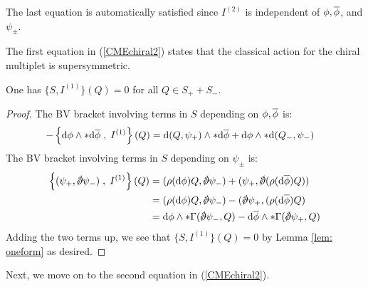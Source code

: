 \documentclass[10pt, oneside]{article}
\begin{document}
The last equation is automatically satisfied since $I^{(2)}$ is independent of $\phi, \Bar{\phi}$, and $\psi_{\pm}$. 

The first equation in (\ref{CMEchiral2}) states that the classical action for the chiral multiplet is supersymmetric. 

\begin{lemma} 
One has $\{S, I^{(1)}\} (Q) = 0$ for all $Q \in S_+ + S_-$. 
\end{lemma}
\begin{proof}
The BV bracket involving terms in $S$ depending on $\phi,\Bar{\phi}$ is:
\begin{align*}
- \left\{\d \phi \wedge * \d \Bar{\phi} \; , \; I^{(1)} \right\}  (Q) & = \d (Q, \psi_+) \wedge * \d \Bar{\phi} + \d \phi \wedge * \d (Q_-, \psi_-) 
\end{align*}
The BV bracket involving terms in $S$ depending on $\psi_\pm$ is:
\begin{align*}
\left\{ (\psi_+ , \sd \dd \psi_-) \; , \; I^{(1)} \right\} (Q) & = (\rho(\d \phi) Q, \sd \dd \psi_-) + (\psi_+, \sd \dd (\rho(\d \Bar{\phi}) Q)) \\ & =  (\rho(\d \phi) Q, \sd \dd \psi_-) - (\sd \dd \psi_+, (\rho(\d \Bar{\phi}) Q) \\ & = \d \phi \wedge * \Gamma(\sd \dd \psi_-, Q) - \d \Bar{\phi} \wedge * \Gamma(\sd \dd \psi_+, Q)
\end{align*}
Adding the two terms up, we see that $\{S,I^{(1)}\}(Q) = 0$ by Lemma \ref{lem: oneform} as desired. 
\end{proof}

Next, we move on to the second equation in (\ref{CMEchiral2}). 
\end{document}
